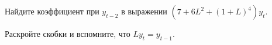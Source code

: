
\begin{question}
Найдите коэффициент при \(y_{t-2}\) в выражении \((7 + 6L^2 + (1+L)^{4})y_t\).
\end{question}

\begin{solution}
Раскройте скобки и вспомните, что \(Ly_t = y_{t-1}\).
\end{solution}

